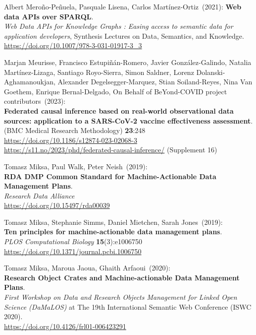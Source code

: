 \begin{thebibliography}{9}
Albert Meroño-Peñuela, Pasquale Lisena, Carlos Martínez-Ortiz~(2021):
\textbf{Web data APIs over {SPARQL}}. \\
\emph{Web Data APIs for Knowledge Graphs : Easing access to semantic data for application developers}, 
Synthesis Lectures on Data, Semantics, and Knowledge.\\
\url{https://doi.org/10.1007/978-3-031-01917-3_3}

Marjan Meurisse, Francisco Estupiñán-Romero, Javier González-Galindo, Natalia Martínez-Lizaga, Santiago Royo-Sierra, Simon Saldner, Lorenz Dolanski-Aghamanoukjan, Alexander Degelsegger-Marquez, Stian Soiland-Reyes, Nina Van Goethem, Enrique Bernal-Delgado, On Behalf of BeYond-COVID project contributors~(2023): \\
\textbf{Federated causal inference based on real-world observational data sources: application to a SARS-CoV-2 vaccine effectiveness assessment}.  \\
(BMC Medical Research Methodology) \textbf{23}:248\\
\url{https://doi.org/10.1186/s12874-023-02068-3}\\
\url{https://s11.no/2023/phd/federated-causal-inference/}
(Supplement 16)

Tomasz Miksa, Paul Walk, Peter Neish~(2019): \\
\textbf{RDA DMP Common Standard for Machine-Actionable Data Management
Plans}.\\
\emph{Research Data Alliance}\\
\url{https://doi.org/10.15497/rda00039}

Tomasz Miksa, Stephanie Simms, Daniel Mietchen, Sarah Jones~(2019): \\
\textbf{Ten principles for machine-actionable data management plans}.\\
\emph{PLOS Computational Biology} \textbf{15}(3):e1006750\\
\url{https://doi.org/10.1371/journal.pcbi.1006750}

Tomasz Miksa, Maroua Jaoua, Ghaith Arfaoui~(2020): \\
\textbf{Research Object Crates and Machine-actionable Data Management
Plans}.\\
\emph{First Workshop on Data and Research Objects Management for Linked
Open Science (DaMaLOS)} at The 19th International Semantic Web
Conference (ISWC 2020).\\
\url{https://doi.org/10.4126/frl01-006423291}


\end{thebibliography}

